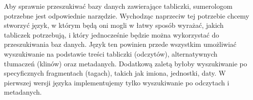 
Aby sprawnie przeszukiwać bazy danych zawierające tabliczki, sumerologom potrzebne jest odpowiednie narzędzie.
Wychodząc naprzeciw tej potrzebie chcemy stworzyć język, w którym będą oni mogli w łatwy sposób wyrażać, jakich tabliczek potrzebują, i który jednocześnie będzie można wykorzystać do przeszukiwania baz danych. Język ten powinien przede wszystkim umożliwiać wyszukiwanie na podstawie treści tabliczki (odczytów), alternatywnych tłumaczeń (klinów) 
oraz metadanych.
Dodatkową zaletą byłoby wyszukiwanie po specyficznych fragmentach (tagach), takich jak imiona, jednostki, daty.
W pierwszej wersji języka implementujemy tylko wyszukiwanie po odczytach i metadanych.